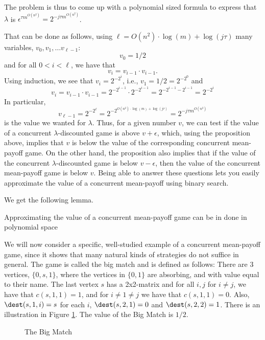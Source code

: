 The problem is thus to come up with a polynomial sized formula to express that $\lambda$ is $\epsilon^{\tau m^{O(n^2)}}=2^{-j \tau m^{O(n^2)}}$.

That can be done as follows, using $\ell=O(n^2)\cdot \log(m)+\log(j\tau)$ many variables, $v_0,v_1,\dots v_{\ell-1}$:
\[
v_0=1/2
\]
and for all $0<i< \ell$, we have that
\[
v_i=v_{i-1}\cdot v_{i-1}.
\]
Using induction, we see that $v_i=2^{-2^{i}}$, i.e., $v_1=1/2=2^{-2^0}$ and \[
v_i=v_{i-1}\cdot v_{i-1}=2^{-2^{i-1}}\cdot 2^{-2^{i-1}}=2^{-2^{i-1}-2^{i-1}}=2^{-2^{i}}\]
In particular, \[
v_{\ell-1}=2^{-2^{\ell}}=2^{-2^{O(n^2)\cdot \log(m)+\log(j\tau)}}=2^{-j\tau m^{O(n^2)}}
\] is the value we wanted for $\lambda$.
Thus, for a given number $v$, we can test if the value of a concurrent  $\lambda$-discounted game is above $v+\epsilon$, which, using the proposition above, implies that $v$ is below the value of the corresponding concurrent mean-payoff game. On the other hand, the proposition also implies that if the value of the concurrent  $\lambda$-discounted game is below $v-\epsilon$, then the value of the concurrent mean-payoff game is below $v$. Being able to answer these questions lets you easily approximate the value of a concurrent mean-payoff using binary search. 

We get the following lemma.
\begin{lemma}
Approximating the value of a concurrent mean-payoff game can be in done in polynomial space
\end{lemma}



We will now consider a specific, well-studied example of a concurrent mean-payoff game, since it shows that many natural kinds of strategies do not suffice in general.
The game is called the big match and is defined as follows:
There are 3 vertices, $\{0,s,1\}$, where the vertices in $\{0,1\}$ are absorbing, and with value equal to their name.
The last vertex $s$ has a 2x2-matrix and for all $i,j$ for $i\neq j$, we have that 
$c(s,1,1)=1$, and for $i\neq 1\neq j$ we have that $c(s,1,1)=0$.
Also,  $\dest(s,1,i)=s$ for each $i$, $\dest(s,2,1)=0$ and $\dest(s,2,2)=1$. There is an illustration in Figure \ref{fig:bm}.
The value of the Big Match is $1/2$.

\begin{figure}

\center
{}
\caption{The Big Match}\label{fig:bm}
\end{figure}

